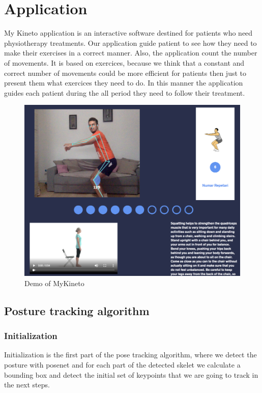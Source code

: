 \documentclass[runningheads,a4paper,11pt]{report}
\begin{document}
\chapter{Application}

\par My Kineto application is an interactive software destined for patients who need physiotherapy treatments. Our application guide patient to see how they need to make their exercises in a correct manner. Also, the application count the number of movements. It is based on exercices, because we think that a constant and correct number of movements could be more efficient for patients then just to present them what exercices they need to do. In this manner the application guides each patient during the all period they need to follow their treatment. 
\begin{figure}[htbp]
	\centerline{\includegraphics[scale=0.8]{fig/demo-mykineto.png}}  
	\caption{Demo of MyKineto}
\end{figure}
\section{Posture tracking algorithm}

\subsection{Initialization}
Initialization is the first part of the pose tracking algorithm, where we detect the posture with posenet and for each part of the detected skelet we calculate a bounding box and detect the initial set of keypoints that we are going to track in the next steps.
\end{document}
